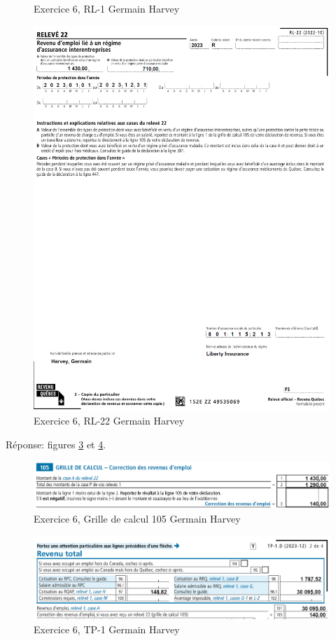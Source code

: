 \begin{sousQuestion}
\begin{figure}
		\caption{Exercice 6, RL-1 Germain Harvey}
		\label{fig:Chap2Exercice6Q1RL1}
	\end{figure}
	\begin{figure}
		\centering
		\includegraphics[width=.9\textwidth]{exercice/2-6/Q1/b-RL22.png}
		\caption{Exercice 6, RL-22 Germain Harvey}
		\label{fig:Chap2Exercice6Q1RL22}
	\end{figure}
\end{sousQuestion}
Réponse: figures \ref{fig:Chap2Exercice6Q1b105Reponse} et \ref{fig:Chap2Exercice6Q1bTP1Reponse}.
\begin{figure}
	\centering
	\includegraphics[width=.9\textwidth]{exercice/2-6/Q1/b-105-reponse.png}
	\caption{Exercice 6, Grille de calcul 105 Germain Harvey}
	\label{fig:Chap2Exercice6Q1b105Reponse}
\end{figure}
\begin{figure}
	\centering
	\includegraphics[width=.9\textwidth]{exercice/2-6/Q1/b-TP1-reponse.png}
	\caption{Exercice 6, TP-1 Germain Harvey}
	\label{fig:Chap2Exercice6Q1bTP1Reponse}
\end{figure}

